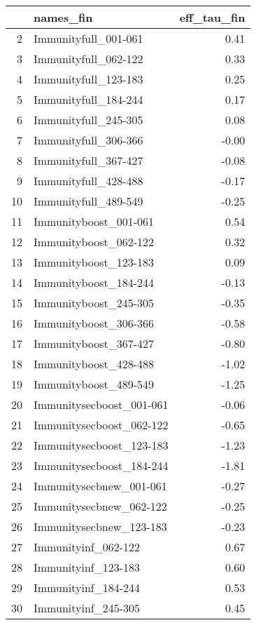 \begin{table}[ht]
\centering
\begin{tabular}{rlr}
  \hline
 & names\_fin & eff\_tau\_fin \\ 
  \hline
2 & Immunityfull\_001-061 & 0.41 \\ 
  3 & Immunityfull\_062-122 & 0.33 \\ 
  4 & Immunityfull\_123-183 & 0.25 \\ 
  5 & Immunityfull\_184-244 & 0.17 \\ 
  6 & Immunityfull\_245-305 & 0.08 \\ 
  7 & Immunityfull\_306-366 & -0.00 \\ 
  8 & Immunityfull\_367-427 & -0.08 \\ 
  9 & Immunityfull\_428-488 & -0.17 \\ 
  10 & Immunityfull\_489-549 & -0.25 \\ 
  11 & Immunityboost\_001-061 & 0.54 \\ 
  12 & Immunityboost\_062-122 & 0.32 \\ 
  13 & Immunityboost\_123-183 & 0.09 \\ 
  14 & Immunityboost\_184-244 & -0.13 \\ 
  15 & Immunityboost\_245-305 & -0.35 \\ 
  16 & Immunityboost\_306-366 & -0.58 \\ 
  17 & Immunityboost\_367-427 & -0.80 \\ 
  18 & Immunityboost\_428-488 & -1.02 \\ 
  19 & Immunityboost\_489-549 & -1.25 \\ 
  20 & Immunitysecboost\_001-061 & -0.06 \\ 
  21 & Immunitysecboost\_062-122 & -0.65 \\ 
  22 & Immunitysecboost\_123-183 & -1.23 \\ 
  23 & Immunitysecboost\_184-244 & -1.81 \\ 
  24 & Immunitysecbnew\_001-061 & -0.27 \\ 
  25 & Immunitysecbnew\_062-122 & -0.25 \\ 
  26 & Immunitysecbnew\_123-183 & -0.23 \\ 
  27 & Immunityinf\_062-122 & 0.67 \\ 
  28 & Immunityinf\_123-183 & 0.60 \\ 
  29 & Immunityinf\_184-244 & 0.53 \\ 
  30 & Immunityinf\_245-305 & 0.45 \\ 

\end{tabular}
\end{table}
